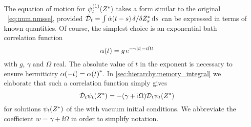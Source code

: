 The equation of motion for $\psitZ[1]$ takes a form similar to the original \NMSSE~\ref{eq:num.nmsse}, provided $\dot{\mathcal{D}}_t = \int\dot\alpha(t-s) \, \delta / \delta {Z}^*_s \, \mathrm{d} s$ can be expressed in terms of known quantities.
Of course, the simplest choice is an exponential bath correlation function
\begin{equation}
  \alpha(t) = g \, \exp[-\gamma \abs{t} - \ii \Omega t]
  \label{eq:num.exp_bcf}
\end{equation}
with $g$, $\gamma$ and $\Omega$ real.
The absolute value of $t$ in the exponent is necessary to ensure hermiticity $\alpha(-t) = {\alpha(t)}^*$.
In \autoref{sec:hierarchy.memory_integral} we elaborate that such a correlation function simply gives
\begin{equation}
  \dot\adjZZ_t \psitZ = - (\gamma + \ii \Omega) \adjZZ_t\psitZ
  \label{eq:num.dot_adjZZt}
\end{equation}
for solutions $\psitZ$ of the \NMSSE with vacuum initial conditions.
We abbreviate the coefficient $w = \gamma + \ii\Omega$ in order to simplify notation.\\



